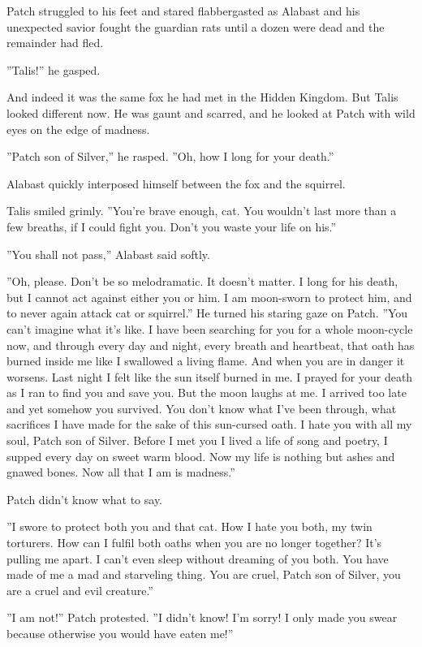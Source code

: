 \documentclass[12pt]{book}
\begin{document}
Patch struggled to his feet and stared flabbergasted as Alabast and his unexpected savior fought the guardian rats until a dozen were dead and the remainder had fled.

''Talis!'' he gasped.

And indeed it was the same fox he had met in the Hidden Kingdom. But Talis looked different now. He was gaunt and scarred, and he looked at Patch with wild eyes on the edge of madness.

''Patch son of Silver,'' he rasped. ''Oh, how I long for your death.''

Alabast quickly interposed himself between the fox and the squirrel.

Talis smiled grimly. ''You're brave enough, cat. You wouldn't last more than a few breaths, if I could fight you. Don't you waste your life on his.''

''You shall not pass,'' Alabast said softly.

''Oh, please. Don't be so melodramatic. It doesn't matter. I long for his death, but I cannot act against either you or him. I am moon-sworn to protect him, and to never again attack cat or squirrel.'' He turned his staring gaze on Patch. ''You can't imagine what it's like. I have been searching for you for a whole moon-cycle now, and through every day and night, every breath and heartbeat, that oath has burned inside me like I swallowed a living flame. And when you are in danger it worsens. Last night I felt like the sun itself burned in me. I prayed for your death as I ran to find you and save you. But the moon laughs at me. I arrived too late and yet somehow you survived. You don't know what I've been through, what sacrifices I have made for the sake of this sun-cursed oath. I hate you with all my soul, Patch son of Silver. Before I met you I lived a life of song and poetry, I supped every day on sweet warm blood. Now my life is nothing but ashes and gnawed bones. Now all that I am is madness.''

Patch didn't know what to say.

''I swore to protect both you and that cat. How I hate you both, my twin torturers. How can I fulfil both oaths when you are no longer together? It's pulling me apart. I can't even sleep without dreaming of you both. You have made of me a mad and starveling thing. You are cruel, Patch son of Silver, you are a cruel and evil creature.''

''I am not!'' Patch protested. ''I didn't know! I'm sorry! I only made you swear because otherwise you would have eaten me!''
\end{document}

